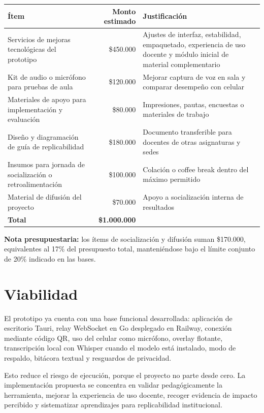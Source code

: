 \documentclass[11pt,letterpaper]{article}
\begin{document}
\begin{tabularx}{\textwidth}{XrX}
\toprule
\textbf{Ítem} & \textbf{Monto estimado} & \textbf{Justificación} \\
\midrule
Servicios de mejoras tecnológicas del prototipo & \$450.000 & Ajustes de interfaz, estabilidad, empaquetado, experiencia de uso docente y módulo inicial de material complementario \\
Kit de audio o micrófono para pruebas de aula & \$120.000 & Mejorar captura de voz en sala y comparar desempeño con celular \\
Materiales de apoyo para implementación y evaluación & \$80.000 & Impresiones, pautas, encuestas o materiales de trabajo \\
Diseño y diagramación de guía de replicabilidad & \$180.000 & Documento transferible para docentes de otras asignaturas y sedes \\
Insumos para jornada de socialización o retroalimentación & \$100.000 & Colación o coffee break dentro del máximo permitido \\
Material de difusión del proyecto & \$70.000 & Apoyo a socialización interna de resultados \\
\midrule
\textbf{Total} & \textbf{\$1.000.000} & \\
\bottomrule
\end{tabularx}

\textbf{Nota presupuestaria:} los ítems de socialización y difusión suman \$170.000, equivalentes al 17\% del presupuesto total, manteniéndose bajo el límite conjunto de 20\% indicado en las bases.

\section{Viabilidad}

El prototipo ya cuenta con una base funcional desarrollada: aplicación de escritorio Tauri, relay WebSocket en Go desplegado en Railway, conexión mediante código QR, uso del celular como micrófono, overlay flotante, transcripción local con Whisper cuando el modelo está instalado, modo de respaldo, bitácora textual y resguardos de privacidad.

Esto reduce el riesgo de ejecución, porque el proyecto no parte desde cero. La implementación propuesta se concentra en validar pedagógicamente la herramienta, mejorar la experiencia de uso docente, recoger evidencia de impacto percibido y sistematizar aprendizajes para replicabilidad institucional.
\end{document}
